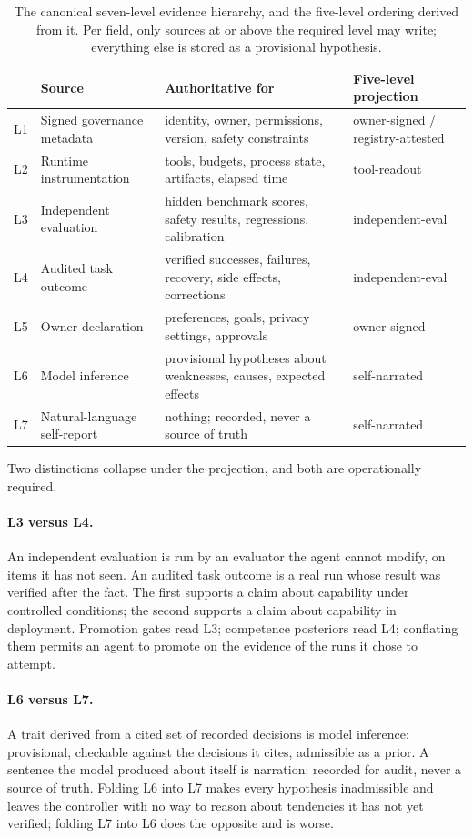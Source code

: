 \documentclass[11pt]{article}
\begin{document}
\begin{table}[t]
\centering\small
\caption{The canonical seven-level evidence hierarchy, and the five-level ordering derived from it. Per field, only sources at or above the required level may write; everything else is stored as a provisional hypothesis.}
\label{tab:evidence}
\begin{tabular}{p{0.6cm} p{4.0cm} p{5.4cm} p{4.6cm}}
\toprule
& \textbf{Source} & \textbf{Authoritative for} & \textbf{Five-level projection} \\
\midrule
L1 & Signed governance metadata & identity, owner, permissions, version, safety constraints & owner-signed / registry-attested \\
L2 & Runtime instrumentation & tools, budgets, process state, artifacts, elapsed time & tool-readout \\
L3 & Independent evaluation & hidden benchmark scores, safety results, regressions, calibration & independent-eval \\
L4 & Audited task outcome & verified successes, failures, recovery, side effects, corrections & independent-eval \\
L5 & Owner declaration & preferences, goals, privacy settings, approvals & owner-signed \\
L6 & Model inference & provisional hypotheses about weaknesses, causes, expected effects & self-narrated \\
L7 & Natural-language self-report & nothing; recorded, never a source of truth & self-narrated \\
\bottomrule
\end{tabular}
\end{table}

Two distinctions collapse under the projection, and both are operationally required.

\paragraph{L3 versus L4.} An independent evaluation is run by an evaluator the agent cannot modify, on items it has not seen. An audited task outcome is a real run whose result was verified after the fact. The first supports a claim about capability under controlled conditions; the second supports a claim about capability in deployment. Promotion gates read L3; competence posteriors read L4; conflating them permits an agent to promote on the evidence of the runs it chose to attempt.

\paragraph{L6 versus L7.} A trait derived from a cited set of recorded decisions is model inference: provisional, checkable against the decisions it cites, admissible as a prior. A sentence the model produced about itself is narration: recorded for audit, never a source of truth. Folding L6 into L7 makes every hypothesis inadmissible and leaves the controller with no way to reason about tendencies it has not yet verified; folding L7 into L6 does the opposite and is worse.
\end{document}
